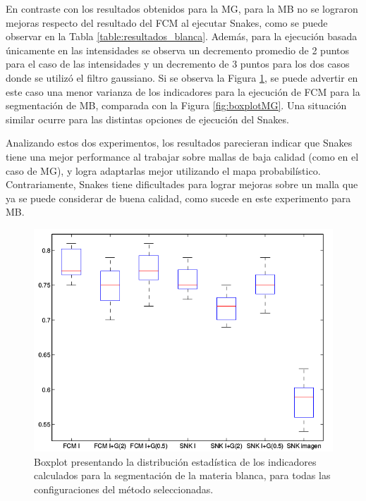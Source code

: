 En contraste con los resultados obtenidos para la MG, para la MB no se lograron mejoras respecto del resultado del FCM al ejecutar Snakes, como se puede observar en la Tabla \ref{table:resultados_blanca}. Además, para la ejecución basada únicamente en las intensidades se observa un decremento promedio de 2 puntos para el caso de las intensidades y un decremento de 3 puntos para los dos casos donde se utilizó el filtro gaussiano. Si se observa la Figura \ref{fig:boxplotMB}, se puede advertir en este caso una menor varianza de los indicadores para la ejecución de FCM para la segmentación de MB, comparada con la Figura \ref{fig:boxplotMG}. Una situación similar ocurre para las distintas opciones de ejecución del Snakes.

Analizando estos dos experimentos, los resultados parecieran indicar que Snakes tiene una mejor performance al trabajar sobre mallas de baja calidad (como en el caso de MG), y logra adaptarlas mejor utilizando el mapa probabilístico. Contrariamente, Snakes tiene dificultades para lograr mejoras sobre un malla que ya se puede considerar de buena calidad, como sucede en este experimento para MB.

\begin{figure}[H]
	\centering
	\includegraphics[scale=0.5]{images/BoxPlotMB.png}
	\caption{Boxplot presentando la distribución estadística de los indicadores calculados para la segmentación de la materia blanca, para todas las configuraciones del método seleccionadas.}
	\label{fig:boxplotMB}
\end{figure}


